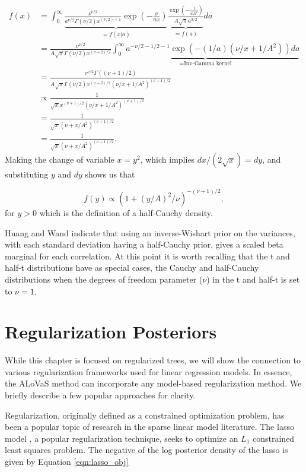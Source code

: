 \begin{align*}
f(x) &= \int_0^\infty \underbrace{  \frac{\nu^{\nu/2}}{a^{\nu/2}\Gamma(\nu/2)x^{(\nu/2)+1}}\exp{(-\frac{\nu}{ax})}   }_{=f(x\vert a)} \underbrace{\frac{\exp{(-\frac{1}{aA^2})}}{A\sqrt{\pi}a^{3/2}}}_{=f(a)} da\\
&=\frac{\nu^{\nu/2}}{A\sqrt{\pi}\Gamma(\nu/2)x^{(\nu+2)/2}}\underbrace{\int_0^\infty a^{-\nu/2-1/2-1}\exp{(-(1/a)(\nu/x+1/A^2))}da}_{=\text{Inv-Gamma kernel}}\\
&=\frac{\nu^{\nu/2}\Gamma((\nu+1)/2)}{A\sqrt{\pi}\Gamma(\nu/2)x^{(\nu+2)/2}(\nu/x+1/A^2)^{(\nu+1)/2}}\\
&\propto \frac{1}{\sqrt{x}x^{(\nu+1)/2}(\nu/x+1/A^2)^{(\nu+1)/2}}\\
& =\frac{1}{\sqrt{x}(\nu+x/A^2)^{(\nu+1)/2}  }\\
&=\frac{1}{\sqrt{x}(\nu+x/A^2)^{(\nu+1)/2}  }.
\end{align*}
Making the change of variable $x=y^2$, which implies $dx/(2\sqrt{x})=dy$, and substituting $y$ and $dy$ shows us that 

\begin{equation}
f(y) \propto (1+(y/A)^2/\nu)^{-(\nu+1)/2},
\end{equation}
for $y>0$ which is the definition of a half-Cauchy density. 

Huang and Wand \cite{huang2013simple} indicate that using an inverse-Wishart prior on the variances, with each standard deviation having a half-Cauchy prior, gives a scaled beta marginal for each correlation. At this point it is worth recalling that the t and half-t distributions have as special cases, the Cauchy and half-Cauchy distributions when the degrees of freedom parameter ($\nu$) in the t and half-t is set to $\nu=1$. 


\section{Regularization Posteriors}\label{subsec:Regularization Priors}
		While this chapter is focused on regularized trees, we will show the connection to various regularization frameworks used for linear regression models. In essence, the ALoVaS method can incorporate any model-based regularization method. We briefly describe a few popular approaches for clarity. 
		
		Regularization, originally defined as a constrained optimization problem, has been a popular topic of research in the sparse linear model literature. The lasso model \cite{tibshirani1996regression}, a popular regularization technique, seeks to optimize an $L_1$ constrained least squares problem. The negative of the log posterior density of the lasso is given by Equation \ref{eqn:lasso_obj}
		
